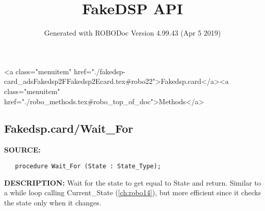 \documentclass{article}
\title{FakeDSP API}
\author{Generated with ROBODoc Version 4.99.43 (Apr  5 2019)
}
\begin{document}
\maketitle
\printindex
\tableofcontents
\newpage

<a class="menuitem" href="./fakedsp-card_adsFakedsp2FFakedsp2Ecard.tex#robo22">Fakedsp.card</a><a class="menuitem" href="./robo_methods.tex#robo_top_of_doc">Methods</a>\subsection{Fakedsp.card/Wait\_For}
\textbf{SOURCE:}\hspace{0.08in}\begin{verbatim}
   procedure Wait_For (State : State_Type);
\end{verbatim}
\textbf{DESCRIPTION:}\hspace{0.08in}
   Wait for the state to get equal to State and return.
   Similar to a while loop calling Current\_State (\ref{ch:robo14}), but more efficient
   since it checks the state only when it changes.
\end{document}
